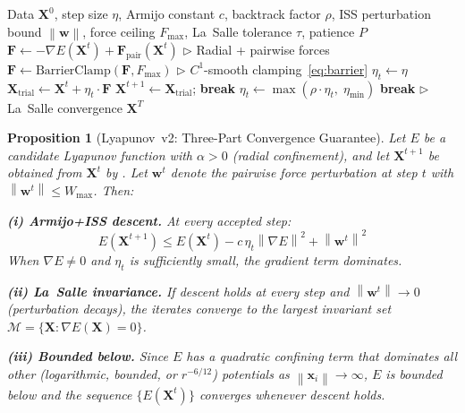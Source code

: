 \documentclass{article}
\newtheorem{proposition}[theorem]{Proposition}
\newcommand{\norm}[1]{\left\lVert#1\right\rVert}
\begin{document}
\begin{algorithm}[t]
\caption{System Mode Engine Iteration with Lyapunov~v2 Controller}
\label{alg:linesearch}
\begin{algorithmic}[1]
\REQUIRE Data $\mathbf{X}^0$, step size $\eta$, Armijo constant $c$, backtrack factor $\rho$, ISS perturbation bound $\norm{\mathbf{w}}$, force ceiling $F_{\max}$, La~Salle tolerance $\tau$, patience $P$
    \STATE $\mathbf{F} \leftarrow -\nabla E(\mathbf{X}^t) + \mathbf{F}_{\text{pair}}(\mathbf{X}^t)$ \hfill $\triangleright$ Radial + pairwise forces
    \STATE $\mathbf{F} \leftarrow \text{BarrierClamp}(\mathbf{F}, F_{\max})$ \hfill $\triangleright$ $C^1$-smooth clamping~\eqref{eq:barrier}
    \STATE $\eta_t \leftarrow \eta$
        \STATE $\mathbf{X}_{\text{trial}} \leftarrow \mathbf{X}^t + \eta_t \cdot \mathbf{F}$
            \STATE $\mathbf{X}^{t+1} \leftarrow \mathbf{X}_{\text{trial}}$; \textbf{break}
        \ELSE
            \STATE $\eta_t \leftarrow \max(\rho \cdot \eta_t,\; \eta_{\min})$
        \ENDIF
    \ENDWHILE
    \IF{$\norm{\nabla E} < \tau$ for $P$ consecutive steps}
        \STATE \textbf{break} \hfill $\triangleright$ La~Salle convergence
    \ENDIF
\ENDFOR
\RETURN $\mathbf{X}^T$
\end{algorithmic}
\end{algorithm}

\begin{proposition}[Lyapunov~v2: Three-Part Convergence Guarantee]
\label{thm:lyapunov}
Let $E$ be a candidate Lyapunov function with $\alpha > 0$ (radial confinement), and let $\mathbf{X}^{t+1}$ be obtained from $\mathbf{X}^t$ by . Let $\mathbf{w}^t$ denote the pairwise force perturbation at step $t$ with $\norm{\mathbf{w}^t} \leq W_{\max}$. Then:

\textbf{(i) Armijo+ISS descent.} At every accepted step:
\begin{equation}
E(\mathbf{X}^{t+1}) \leq E(\mathbf{X}^t) - c\, \eta_t \norm{\nabla E}^2 + \norm{\mathbf{w}^t}^2
\label{eq:lyap_descent}
\end{equation}
When $\nabla E \neq 0$ and $\eta_t$ is sufficiently small, the gradient term dominates.

\textbf{(ii) La~Salle invariance.} If descent holds at every step and $\norm{\mathbf{w}^t} \to 0$ (perturbation decays), the iterates converge to the largest invariant set $\mathcal{M} = \{\mathbf{X} : \nabla E(\mathbf{X}) = 0\}$.

\textbf{(iii) Bounded below.} Since $E$ has a quadratic confining term that dominates all other (logarithmic, bounded, or $r^{-6/12}$) potentials as $\norm{\mathbf{x}_i} \to \infty$, $E$ is bounded below and the sequence $\{E(\mathbf{X}^t)\}$ converges whenever descent holds.
\end{proposition}
\end{document}
